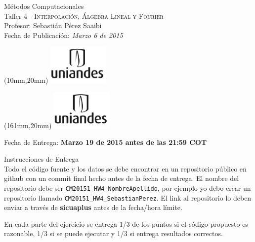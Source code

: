 \documentclass[11pt,letterpaper]{exam}
\begin{document}
\begin{center}
{\Large Métodos Computacionales} \\
Taller 4 - \textsc{Interpolación, Álgebra Lineal y Fourier} \\
Profesor: Sebastián Pérez Saaibi\\
Fecha de Publicación: {\small \it Marzo 6 de 2015}\\
\end{center}

\begin{textblock*}{40mm}(10mm,20mm)
  \includegraphics[width=3cm]{logoUniandes.png}
\end{textblock*}

\begin{textblock*}{40mm}(161mm,20mm)
  \includegraphics[width=3cm]{logoUniandes.png}
\end{textblock*}

\vspace{0.5cm}

{\Large Fecha de Entrega:  \bf Marzo 19 de 2015 antes de las 21:59 COT}

\vspace{0.5cm}

{\Large Instrucciones de Entrega}\\


Todo el código fuente y los datos se debe encontrar en un repositorio público en github con un commit final hecho antes de la fecha de entrega. El nombre del repositorio debe ser \newline \verb+CM20151_HW4_NombreApellido+, por ejemplo yo debo crear un repositorio llamado \newline \verb+CM20151_HW4_SebastianPerez+. El link al repositorio lo deben enviar a través de \textbf{sicuaplus} antes de la fecha/hora límite.

En cada parte del ejercicio se entrega 1/3 de los puntos si el código propuesto es razonable, 1/3 si se puede ejecutar y 1/3 si entrega resultados correctos.

\vspace{0.5cm}
\end{document}
